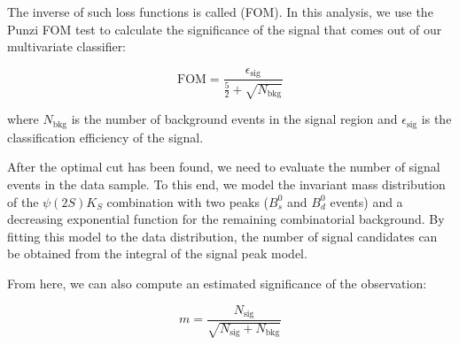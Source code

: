 The inverse of such loss functions is called  (FOM). In this analysis, we use the Punzi FOM test to calculate the significance of the signal that comes out of our multivariate classifier:

\begin{equation}
    \text{FOM}=\frac{\epsilon_{\text{sig}}}{\frac{5}{2}+\sqrt{N_{\text{bkg}}}}
    \label{eq:punzi}
\end{equation}

where $N_{\text{bkg}}$ is the number of background events in the signal region and $\epsilon_{\text{sig}}$ is the classification efficiency of the signal.

After the optimal cut has been found, we need to evaluate the number of signal events in the data sample. To this end, we model the invariant mass distribution of the $\psi(2S)K_{S}$ combination with two peaks ($B_s^0$ and $B_d^0$ events) and a decreasing exponential function
for the remaining combinatorial background. By fitting this model to the data distribution, the number of signal candidates can be obtained from the integral of the signal peak model.

From here, we can also compute an estimated significance of the observation:

\begin{equation}
    m=\frac{N_{\text{sig}}}{\sqrt{N_{\text{sig}}+N_{\text{bkg}}}}
    \label{eq:sig}
\end{equation}
